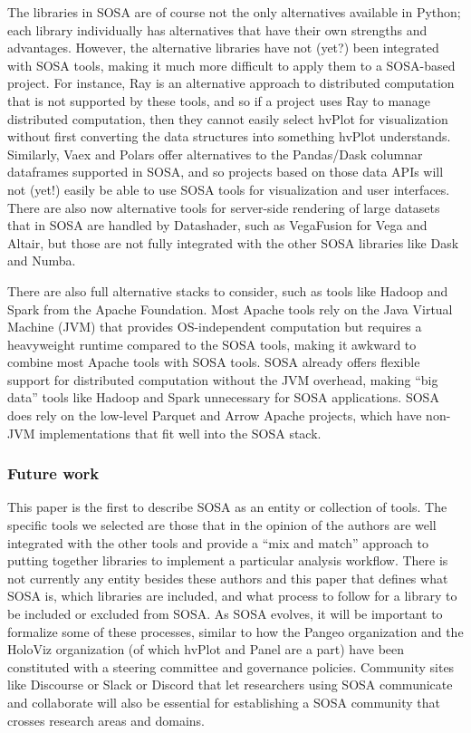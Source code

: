 The libraries in SOSA are of course not the only alternatives available in Python; each library individually has alternatives that have their own strengths and advantages. However, the alternative libraries have not (yet?) been integrated with SOSA tools, making it much more difficult to apply them to a SOSA-based project. For instance, Ray is an alternative approach to distributed computation that is not supported by these tools, and so if a project uses Ray to manage distributed computation, then they cannot easily select hvPlot for visualization without first converting the data structures into something hvPlot understands. Similarly, Vaex and Polars offer alternatives to the Pandas/Dask columnar dataframes supported in SOSA, and so projects based on those data APIs will not (yet!) easily be able to use SOSA tools for visualization and user interfaces. There are also now alternative tools for server-side rendering of large datasets that in SOSA are handled by Datashader, such as VegaFusion for Vega and Altair, but those are not fully integrated with the other SOSA libraries like Dask and Numba.

There are also full alternative stacks to consider, such as tools like Hadoop and Spark from the Apache Foundation. Most Apache tools rely on the Java Virtual Machine (JVM) that provides OS-independent computation but requires a heavyweight runtime compared to the SOSA tools, making it awkward to combine most Apache tools with SOSA tools. SOSA already offers flexible support for distributed computation without the JVM overhead, making ``big data'' tools like Hadoop and Spark unnecessary for SOSA applications. SOSA does rely on the low-level Parquet and Arrow Apache projects, which have non-JVM implementations that fit well into the SOSA stack.

\subsubsection{Future work}
This paper is the first to describe SOSA as an entity or collection of tools. The specific tools we selected are those that in the opinion of the authors are well integrated with the other tools and provide a ``mix and match'' approach to putting together libraries to implement a particular analysis workflow. There is not currently any entity besides these authors and this paper that defines what SOSA is, which libraries are included, and what process to follow for a library to be included or excluded from SOSA. As SOSA evolves, it will be important to formalize some of these processes, similar to how the Pangeo organization and the HoloViz organization (of which hvPlot and Panel are a part) have been constituted with a steering committee and governance policies. Community sites like Discourse or Slack or Discord that let researchers using SOSA communicate and collaborate will also be essential for establishing a SOSA community that crosses research areas and domains.

